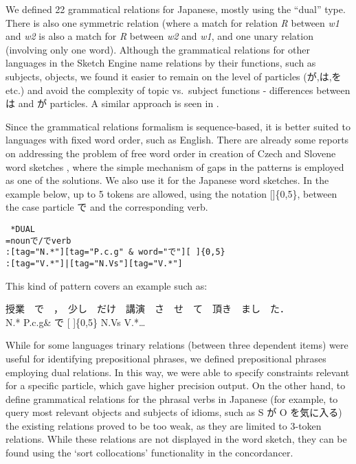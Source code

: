 \documentclass[english]{jnlp_1.4}
\begin{document}
We defined 22 grammatical relations for Japanese, mostly using the ``dual'' type. There is also one symmetric relation (where a match for relation \textit{R} between \textit{w1} and \textit{w2} is also a match for \textit{R} between \textit{w2} and \textit{w1}, and one unary relation (involving only one word). Although the grammatical relations for other languages in the Sketch Engine name relations by their functions, such as subjects, objects, we found it easier to remain on the level of particles (が,は,を etc.) and avoid the complexity of topic vs.\ subject functions - differences between は and が particles. A similar approach is seen in .

Since the grammatical relations formalism is sequence-based, it is
better suited to languages with fixed word order, such as
English. There are already some reports on addressing the problem of
free word order in creation of Czech and Slovene word sketches
, where the simple mechanism of gaps in
the patterns is employed as one of the solutions. We also use it for
the Japanese word sketches. In the example below, up to 5 tokens are
allowed, using the notation []\{0,5\}, between the case particle で
and the corresponding verb.

\texttt{
*DUAL\\
\indent\indent
=nounで/でverb\\
\indent{}:[tag="N.*"][tag="P.c.g" \& word="で"][ ]\{0,5\} \\\indent{}:[tag="V.*"]|[tag="N.Vs"][tag="V.*"]}

This kind of pattern covers an example such as: 

授業　で　，　少し　だけ　講演　さ　せ　て　頂き　まし　た．\\
\indent N.*  P.c.g\& で [ ]\{0,5\}  N.Vs V.*\ldots 

While for some languages trinary relations (between three dependent items) were useful for identifying prepositional phrases, we defined prepositional phrases employing dual relations. In this way, we were able to specify constraints relevant for a specific particle, which gave higher precision output. On the other hand, to define grammatical relations for the phrasal verbs in Japanese (for example, to query most relevant objects and subjects of idioms, such as S が O を気に入る) the existing relations proved to be too weak, as they are limited to 3-token relations. While these relations are not displayed in the word sketch, they can be found using the `sort collocations' functionality in the concordancer.
\end{document}
